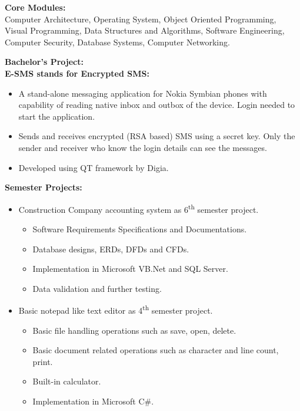 \documentclass[a4paper]{article}
\begin{document}
                \begin{description}
                    \item \textbf{Core Modules:}\\
                    Computer Architecture, Operating System, Object Oriented Programming, Visual Programming, Data Structures and Algorithms, Software Engineering, Computer Security, Database Systems, Computer Networking.
                    \item \textbf{Bachelor's Project:}\\
                    \textbf{E-SMS stands for Encrypted SMS:}
                    \begin{itemize}
                        \item A stand-alone messaging application for Nokia Symbian phones with capability of reading native inbox and outbox of the device. Login needed to start the application.
                        \item Sends and receives encrypted (RSA based) SMS using a secret key. Only the sender and receiver who know the login details can see the messages.
                        \item Developed using QT framework by Digia.
                    \end{itemize}
                \textbf{Semester Projects:}
                \begin{itemize}
                    \item Construction Company accounting system as 6\textsuperscript{th} semester project.
                    \begin{itemize}
                        \item Software Requirements Specifications and Documentations.
                        \item Database designs, ERDs, DFDs and CFDs.
                        \item Implementation in Microsoft VB.Net and SQL Server.
                        \item Data validation and further testing.
                    \end{itemize}
                    \item Basic notepad like text editor as 4\textsuperscript{th} semester project.
                    \begin{itemize}
                        \item Basic file handling operations such as save, open, delete.
                        \item Basic document related operations such as character and line count, print.
                        \item Built-in calculator.
                        \item Implementation in Microsoft C\#.
                    \end{itemize}
                \end{itemize}
        
            \end{description}
            
\end{document}
